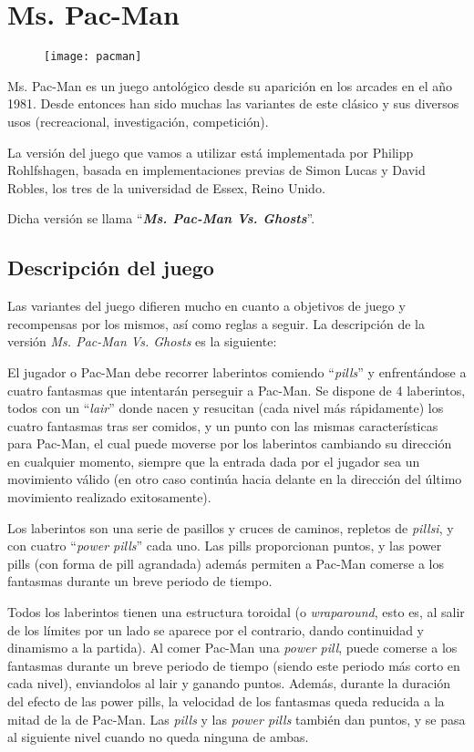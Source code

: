 \chapter{Ms. Pac-Man}
\begin{figure}[H]
\centering
\texttt{[image: pacman]}
\end{figure}

Ms. Pac-Man es un juego antológico desde su aparición en los arcades en el año 1981. Desde entonces han sido muchas las variantes de este clásico y sus diversos usos (recreacional, investigación, competición).
 
La versión del juego que vamos a utilizar está implementada por Philipp Rohlfshagen, basada en implementaciones previas de Simon Lucas y David Robles, los tres de la universidad de Essex, Reino Unido.
 
Dicha versión se llama ``\textbf{\textit{Ms. Pac-Man Vs. Ghosts}}''\cite{pacmanvsghostsTournamentPage}\cite{pacmanvsghostsGit}.

\section{Descripción del juego}
Las variantes del juego difieren mucho en cuanto a objetivos de juego y recompensas por los mismos, así como reglas a seguir. La descripción de la versión \textit{Ms. Pac-Man Vs. Ghosts} es la siguiente:

El jugador o Pac-Man debe recorrer laberintos comiendo ``\textit{pills}'' y enfrentándose a cuatro fantasmas que intentarán perseguir a Pac-Man. Se dispone de 4 laberintos, todos con un ``\textit{lair}'' donde nacen y resucitan (cada nivel más rápidamente) los cuatro fantasmas tras ser comidos, y un punto con las mismas características para Pac-Man, el cual puede moverse por los laberintos cambiando su dirección en cualquier momento, siempre que la entrada dada por el jugador sea un movimiento válido (en otro caso continúa hacia delante en la dirección del último movimiento realizado exitosamente).
 
\blankline

Los laberintos son una serie de pasillos y cruces de caminos, repletos de \textit{pillsi}, y con cuatro ``\textit{power pills}'' cada uno. Las pills proporcionan puntos, y las power pills (con forma de pill agrandada) además permiten a Pac-Man comerse a los fantasmas durante un breve periodo de tiempo.

Todos los laberintos tienen una estructura toroidal (o \textit{wraparound}, esto es, al salir de los límites por un lado se aparece por el contrario, dando continuidad y dinamismo a la partida). Al comer Pac-Man una \textit{power pill}, puede comerse a los fantasmas durante un breve periodo de tiempo (siendo este periodo más corto en cada nivel), enviandolos al lair y ganando puntos. Además, durante la duración del efecto de las power pills, la velocidad de los fantasmas queda reducida a la mitad de la de Pac-Man. Las \textit{pills} y las \textit{power pills} también dan puntos, y se pasa al siguiente nivel cuando no queda ninguna de ambas.
 
